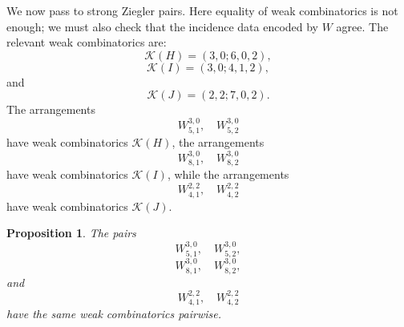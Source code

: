 \documentclass[11pt]{article}
\theoremstyle{plain}
\newtheorem{proposition}[thm]{Proposition}
\theoremstyle{definition}
\newtheorem{remark}[thm]{Remark}
\newtheorem{example}[thm]{Example}
\begin{document}

We now pass to strong Ziegler pairs. Here equality of weak combinatorics is not enough; we must also
check that the incidence data encoded by \(W\) agree. The relevant weak combinatorics are:
\[
\mathcal{K}(H)=(3,0;6,0,2),
\]
\[
\mathcal{K}(I)=(3,0;4,1,2),
\]
and
\[
\mathcal{K}(J)=(2,2;7,0,2).
\]
The arrangements
\[
W^{3,0}_{5,1},\quad W^{3,0}_{5,2}
\]
have weak combinatorics \(\mathcal{K}(H)\), the arrangements
\[
W^{3,0}_{8,1},\quad W^{3,0}_{8,2}
\]
have weak combinatorics \(\mathcal{K}(I)\), while the arrangements
\[
W^{2,2}_{4,1},\quad W^{2,2}_{4,2}
\]
have weak combinatorics \(\mathcal{K}(J)\).

\begin{proposition}\label{prop:strong-same-weak}
The pairs
\[
W^{3,0}_{5,1},\quad W^{3,0}_{5,2},
\]
\[
W^{3,0}_{8,1},\quad W^{3,0}_{8,2},
\]
and
\[
W^{2,2}_{4,1},\quad W^{2,2}_{4,2}
\]
have the same weak combinatorics pairwise.
\end{proposition}
\end{document}

